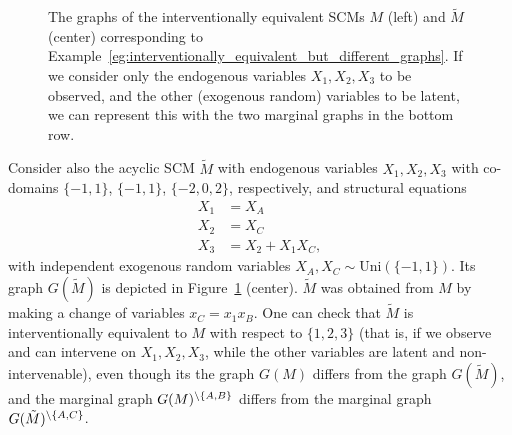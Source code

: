 \begin{Eg}
\begin{figure}
\begin{center}
  \end{center}
  \caption{The graphs of the interventionally equivalent SCMs $M$ (left) and $\tilde{M}$ (center) corresponding to Example~\ref{eg:interventionally_equivalent_but_different_graphs}. If we consider only the endogenous variables $X_1,X_2,X_3$ to be observed, and the other (exogenous random) variables to be latent, we can represent this with the two marginal graphs in the bottom row.\label{fig:interventionally_equivalent_but_different_graphs}}
\end{figure}
Consider also the acyclic SCM $\tilde{M}$ with endogenous variables $X_1,X_2,X_3$ with co-domains $\{-1,1\}$, $\{-1,1\}$, $\{-2,0,2\}$, respectively, and structural equations
$$
  \begin{aligned} 
    X_1 &= X_A \\
    X_2 &= X_C \\
    X_3 &= X_2 + X_1 X_C,
  \end{aligned} 
$$
with independent exogenous random variables $X_A,X_C \sim \mathrm{Uni}(\{-1,1\})$.
Its graph $G(\tilde{M})$ is depicted in Figure~\ref{fig:interventionally_equivalent_but_different_graphs} (center).
$\tilde{M}$ was obtained from $M$ by making a change of variables $x_C = x_1 x_B$.
One can check that $\tilde{M}$ is interventionally equivalent to $M$ with respect to
$\{1,2,3\}$ (that is, if we observe and can intervene on $X_1,X_2,X_3$, while the
other variables are latent and non-intervenable), even though its the graph $G(M)$ differs from the graph $G(\tilde{M})$,
and the marginal graph $G(M)^{\setminus \{A,B\}}$ differs from the marginal graph $G(\tilde{M})^{\setminus \{A,C\}}$.
\end{Eg}

